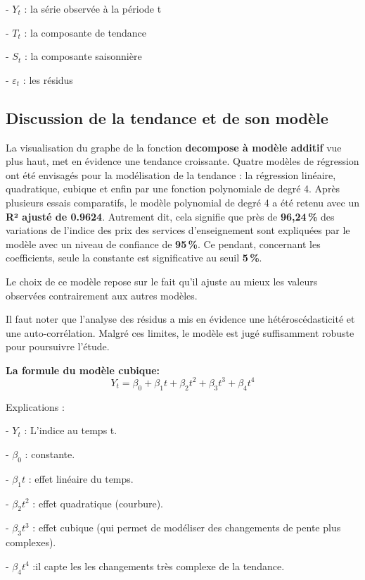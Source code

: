 \documentclass[
12pt,          %
a4paper,       %
oneside,       %
openright      %
]{report}
\begin{document}
- $Y_t$ : la série observée à la période t

- $T_t$ : la composante de tendance

- $S_t$ : la composante saisonnière

- $\varepsilon_t$ :  les résidus 


 \subsection{ Discussion de la tendance et de son modèle}
   La visualisation du graphe de la fonction \textbf{decompose à modèle additif} vue plus haut, met en évidence une tendance croissante.
  Quatre modèles de régression ont été envisagés pour la modélisation de la tendance : la régression linéaire, quadratique, cubique et enfin par une fonction polynomiale de degré 4. Après plusieurs essais comparatifs, le modèle polynomial de degré 4 a été retenu avec un \textbf{ R² ajusté de 0.9624}. Autrement dit, cela signifie que près de \textbf{96,24\,\%} des variations de l'indice des prix des services d'enseignement sont expliquées par le modèle avec un niveau de confiance de \textbf{95\,\%}. 
  Ce pendant, concernant les coefficients, seule la constante est significative  au seuil \textbf{5\,\%}.
 
  Le choix de ce modèle repose sur le fait qu'il ajuste au mieux les valeurs observées contrairement aux autres modèles.
  
  Il faut noter que l’analyse des résidus a mis en évidence une hétéroscédasticité et une auto-corrélation. Malgré ces limites, le modèle est jugé suffisamment robuste pour poursuivre l’étude.
  
  \textbf{La formule du modèle cubique: }
  \[
  Y_t = \beta_0 + \beta_1 t + \beta_2 t^2 + \beta_3 t^3 + \beta_4 t^4 
  \]
  
 Explications : 
 
 - $Y_t$ : L'indice au temps t.
 
 - $\beta_0$  : constante.
 
 - $\beta_1t$ : effet linéaire du temps.
 
 - $\beta_2t^2$ : effet quadratique (courbure).
 
 - $\beta_3t^3$ : effet cubique (qui permet de modéliser des changements de pente plus complexes).
 
 - $\beta_4t^4$ :il capte les les changements très complexe de la tendance.
 
 
 
 
 
\end{document}
